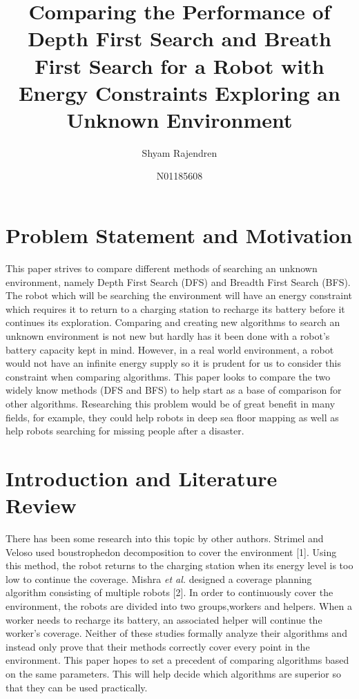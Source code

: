 \documentclass{article}
\title{Comparing the Performance of Depth First Search and Breath First Search for a Robot with Energy Constraints Exploring an Unknown Environment}
\author{Shyam Rajendren}
\date{N01185608}
\begin{document}
\maketitle

\section{Problem Statement and Motivation}
This paper strives to compare different methods of searching an unknown environment, namely Depth First Search (DFS) and Breadth First Search (BFS). The robot which will be searching the environment will have an energy constraint which requires it to return to a charging station to recharge its battery before it continues its exploration. Comparing and creating new algorithms to search an unknown environment is not new but hardly has it been done with a robot's battery capacity kept in mind. However, in a real world environment, a robot would not have an infinite energy supply so it is prudent for us to consider this constraint when comparing algorithms. This paper looks to compare the two widely know methods (DFS and BFS) to help start as a base of comparison for other algorithms. Researching this problem would be of great benefit in many fields, for example, they could help robots in deep sea floor mapping as well as help robots searching for missing people after a disaster.

\section{Introduction and Literature Review}
There has been some research into this topic by other authors. Strimel and Veloso used boustrophedon decomposition to cover the environment [1]. Using this method, the robot returns to the charging station when its energy level is too low to continue the coverage. Mishra \textit{et al.} designed a coverage planning algorithm consisting of multiple robots [2]. In order to continuously cover the environment, the robots are divided into two groups,workers and helpers. When a worker needs to recharge its battery, an associated helper will continue the worker’s coverage. Neither of these studies formally analyze their algorithms and instead only prove that their methods correctly cover every point in the environment. This paper hopes to set a precedent of comparing algorithms based on the same parameters. This will help decide which algorithms are superior so that they can be used practically.
\end{document}
